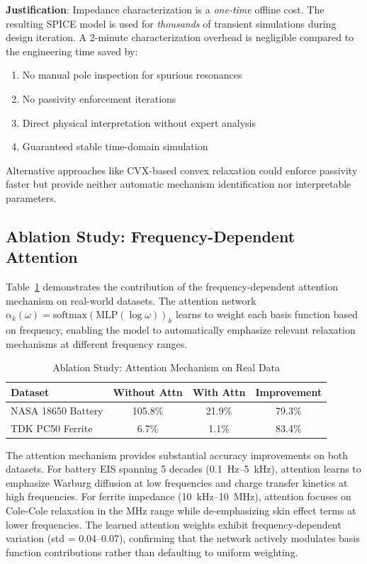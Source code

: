 \documentclass{ieeeaccess}
\begin{document}
\textbf{Justification}: Impedance characterization is a \textit{one-time} offline cost. The resulting SPICE model is used for \textit{thousands} of transient simulations during design iteration. A 2-minute characterization overhead is negligible compared to the engineering time saved by:
\begin{enumerate}
\item No manual pole inspection for spurious resonances
\item No passivity enforcement iterations
\item Direct physical interpretation without expert analysis
\item Guaranteed stable time-domain simulation
\end{enumerate}

Alternative approaches like CVX-based convex relaxation could enforce passivity faster but provide neither automatic mechanism identification nor interpretable parameters.

\subsection{Ablation Study: Frequency-Dependent Attention}
\label{sec:ablation}

Table~\ref{tab:ablation} demonstrates the contribution of the frequency-dependent attention mechanism on real-world datasets. The attention network $\alpha_k(\omega) = \text{softmax}(\text{MLP}(\log\omega))_k$ learns to weight each basis function based on frequency, enabling the model to automatically emphasize relevant relaxation mechanisms at different frequency ranges.

\begin{table}[!t]
\caption{Ablation Study: Attention Mechanism on Real Data}
\label{tab:ablation}
\centering
\begin{tabular}{@{}lccc@{}}
\toprule
\textbf{Dataset} & \textbf{Without Attn} & \textbf{With Attn} & \textbf{Improvement} \\
\midrule
NASA 18650 Battery & 105.8\% & 21.9\% & 79.3\% \\
TDK PC50 Ferrite & 6.7\% & 1.1\% & 83.4\% \\
\bottomrule
\end{tabular}
\end{table}

The attention mechanism provides substantial accuracy improvements on both datasets. For battery EIS spanning 5 decades (0.1~Hz--5~kHz), attention learns to emphasize Warburg diffusion at low frequencies and charge transfer kinetics at high frequencies. For ferrite impedance (10~kHz--10~MHz), attention focuses on Cole-Cole relaxation in the MHz range while de-emphasizing skin effect terms at lower frequencies. The learned attention weights exhibit frequency-dependent variation (std = 0.04--0.07), confirming that the network actively modulates basis function contributions rather than defaulting to uniform weighting.
\end{document}
